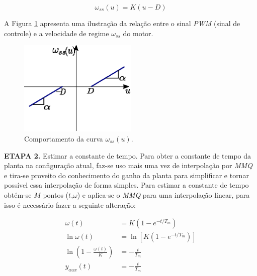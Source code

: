 \begin{equation}
    \omega_{ss}(u) = K(u - D)
    \label{eq:omega_x_sinal_de_controle}
\end{equation}



A Figura \ref{fig:ilustracao_omega_x_pwm} apresenta uma ilustração da relação entre o sinal \emph{PWM} (sinal de controle) e a velocidade de regime $\omega_{ss}$ do motor.

\begin{figure}[H]
    \centering
    \includegraphics[width=0.5\textwidth]{figuras/ilustracoes/omega_x_sinal_controle.eps}
    \caption{Comportamento da curva $\omega_{ss}(u)$.}
    \label{fig:ilustracao_omega_x_pwm}
\end{figure}

    
\textbf{ETAPA 2.} Estimar a constante de tempo. Para obter a constante de tempo da planta na configuração atual, faz-se uso mais uma vez de interpolação por \textit{MMQ} e tira-se proveito do conhecimento do ganho da planta para simplificar e tornar possível essa interpolação de forma simples. Para estimar a constante de tempo obtém-se $M$ pontos ($t$,$\omega$) e aplica-se o \textit{MMQ} para uma interpolação linear, para isso é necessário fazer a seguinte alteração:
    

\begin{align*}
    \omega(t) &= K\left( 1 - e^{-t/T_m} \right)\\
    \ln{\omega(t)} &= \ln\left[K( 1 - e^{-t/T_m})\right]\\
    \ln\left(1 - \frac{\omega(t)}{K} \right) &= -\frac{t}{T_m}\\
    y_{aux}(t) &= -\frac{t}{T_m}
\end{align*}

